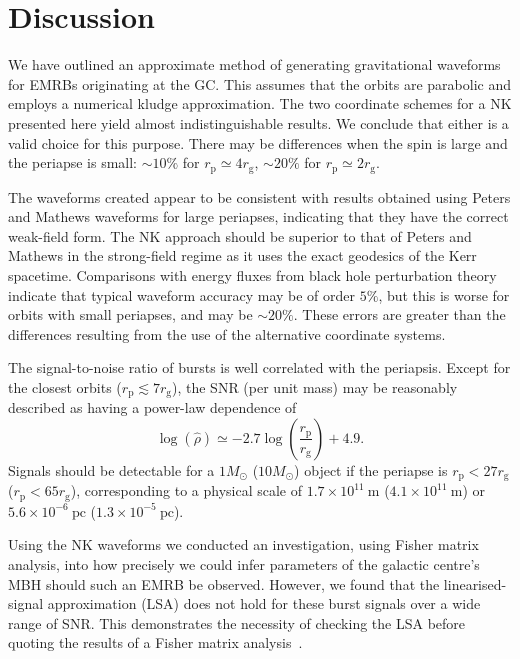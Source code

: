 \documentclass[useAMS,usedcolumn,usegraphicx,usenatbib]{mn2e}
\newcommand{\units}[1]{\ensuremath{~\mathrm{#1}}}
\newcommand{\sub}[1]{\ensuremath{_\mathrm{#1}}}
\begin{document}
\section{Discussion}\label{sec:End}

We have outlined an approximate method of generating gravitational waveforms for EMRBs originating at the GC. This assumes that the orbits are parabolic and employs a numerical kludge approximation. The two coordinate schemes for a NK presented here yield almost indistinguishable results. We conclude that either is a valid choice for this purpose. There may be differences when the spin is large and the periapse is small: $\sim 10\%$ for $r\sub{p} \simeq 4 r\sub{g}$, $\sim 20\%$ for $r\sub{p} \simeq 2 r\sub{g}$.

The waveforms created appear to be consistent with results obtained using Peters and Mathews waveforms for large periapses, indicating that they have the correct weak-field form. The NK approach should be superior to that of Peters and Mathews in the strong-field regime as it uses the exact geodesics of the Kerr spacetime. Comparisons with energy fluxes from black hole perturbation theory indicate that typical waveform accuracy may be of order $5\%$, but this is worse for orbits with small periapses, and may be $\sim 20\%$. These errors are greater than the differences resulting from the use of the alternative coordinate systems.

The signal-to-noise ratio of bursts is well correlated with the periapsis. Except for the closest orbits ($r\sub{p} \lesssim 7 r\sub{g}$), the SNR (per unit mass) may be reasonably described as having a power-law dependence of
\begin{equation}
\log\left(\hat{\rho}\right) \simeq -2.7\log\left(\frac{r\sub{p}}{r\sub{g}}\right) + 4.9.
\end{equation}
Signals should be detectable for a $1 M_\odot$ ($10 M_\odot$) object if the periapse is $r\sub{p} < 27 r\sub{g}$ ($r\sub{p} < 65 r\sub{g}$), corresponding to a physical scale of $1.7 \times 10^{11}\units{m}$ ($4.1 \times 10^{11}\units{m}$) or $5.6 \times 10^{-6}\units{pc}$ ($1.3 \times 10^{-5}\units{pc}$).

Using the NK waveforms we conducted an investigation, using Fisher matrix analysis, into how precisely we could infer parameters of the galactic centre's MBH should such an EMRB be observed. However, we found that the linearised-signal approximation (LSA) does not hold for these burst signals over a wide range of SNR. This demonstrates the necessity of checking the LSA before quoting the results of a Fisher matrix analysis~\citep{Vallisneri2008}.
\end{document}
